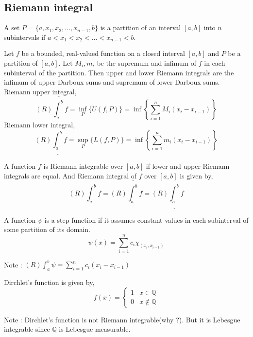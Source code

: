 \subsection{Riemann integral}
\begin{definition}[partition]
	A set $P = \{a,x_1,x_2,\dots,x_{n-1},b \}$ is a partition of an interval $[a,b]$ into $n$ subintervals if $a < x_1 < x_2 < \dots < x_{n-1} < b$.
\end{definition}
\begin{definition}
	Let $f$ be a bounded, real-valued function on a closed interval $[a,b]$ and $P$ be a partition of $[a,b]$.
	Let $M_i,m_i$ be the supremum and infimum of $f$ in each subinterval of the partition.
	Then upper and lower Riemann integrals are the infimum of upper Darboux sums and supremum of lower Darboux sums.\\

	Riemann upper integral, 
	\begin{equation}
	 (R)\overline{\int_a^b} f = \inf_P \{ U(f,P) \} = \inf \left\{ \sum_{i=1}^n M_i (x_i - x_{i-1}) \right\} 
	\end{equation}
	Riemann lower integral, 
	\begin{equation}
	 (R)\underline{\int_a^b} f = \sup_P \{ L(f,P) \} = \inf \left\{ \sum_{i=1}^n m_i (x_i - x_{i-1}) \right\} 
	\end{equation}
\end{definition}
\begin{definition}
	A function $f$ is Riemann integrable over $[a,b]$ if lower and upper Riemann integrals are equal.
	And Riemann integral of $f$ over $[a,b]$ is given by,
	\begin{equation}
		(R)\int_a^b f = (R)\overline{\int_a^b} f = (R) \underline{\int_a^b} f 
	\end{equation}
\end{definition}

\begin{definition}
	A function $\psi$ is a step function if it assumes constant values in each subinterval of some partition of its domain.
	$$ \psi(x) = \sum_{i = 1}^n c_i \chi_{(x_i,x_{i-1})} $$
\end{definition}
Note : $\displaystyle (R)\int_a^b \psi = \sum_{i=1}^n c_i (x_i-x_{i-1})$
\begin{definition}
	Dirchlet's function is given by,
	$$ f(x) = \begin{cases} 1 & x \in \mathbb{Q} \\ 0 & x \notin \mathbb{Q} \end{cases} $$
\end{definition}
Note : Dirchlet's function is not Riemann integrable(why ?). But it is Lebesgue integrable since $\mathbb{Q}$ is Lebesgue measurable.


